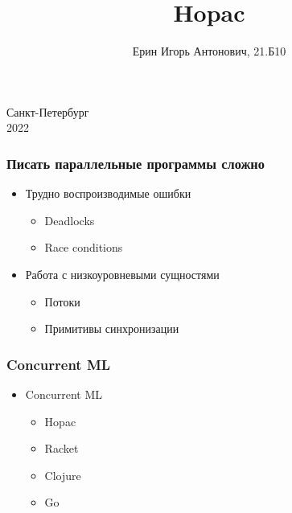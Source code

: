 \documentclass{beamer}
\title[Hopac]{Hopac}
\institute[СПбГУ]{}
\author[Ерин Игорь]{Ерин Игорь Антонович, 21.Б10}
\begin{document}
{
    \begin{frame}
        \vspace{-35pt}
        \hspace{-10pt}
        \begin{center}
            \titlepage
        \end{center}

        \btVFill

        \begin{center}
            \vspace{5pt}
            \scriptsize{Санкт-Петербург\\
            2022}
        \end{center}

    \end{frame}
}

    \begin{frame}[fragile]
        \frametitle{Писать параллельные программы сложно}
        \begin{itemize}
            \item Трудно воспроизводимые ошибки
            \begin{itemize}
                \item Deadlocks
                \item Race conditions
            \end{itemize}
            \item Работа с низкоуровневыми сущностями
            \begin{itemize}
                \item Потоки
                \item Примитивы синхронизации
            \end{itemize}
        \end{itemize}
    \end{frame}

    \begin{frame}
        \frametitle{Concurrent ML}
        \begin{itemize}
            \item Concurrent ML
            \begin{itemize}
                \item Hopac
                \item Racket
                \item Clojure
                \item Go
            \end{itemize}
        \end{itemize}
    \end{frame}
\end{document}
